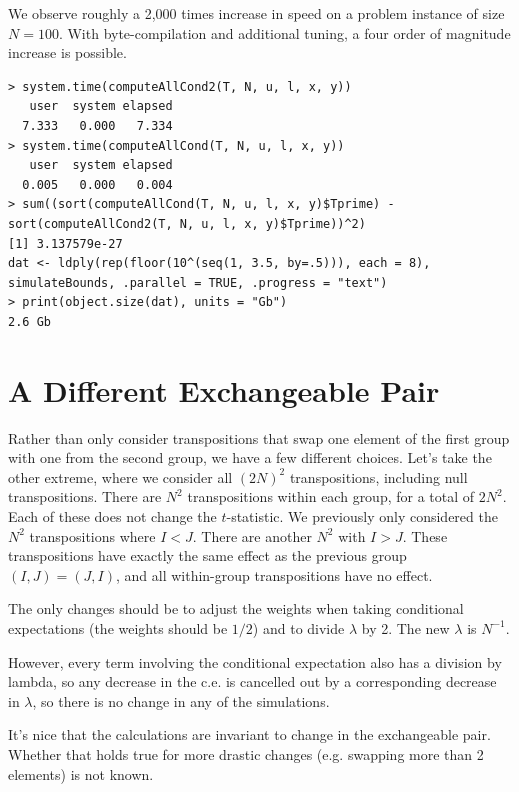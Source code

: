 We observe roughly a 2,000 times increase in speed on a problem instance of size $N=100$.  With
byte-compilation and additional tuning, a four order of magnitude increase is possible.  
\begin{verbatim}
> system.time(computeAllCond2(T, N, u, l, x, y))
   user  system elapsed 
  7.333   0.000   7.334 
> system.time(computeAllCond(T, N, u, l, x, y))
   user  system elapsed 
  0.005   0.000   0.004 
> sum((sort(computeAllCond(T, N, u, l, x, y)$Tprime) - sort(computeAllCond2(T, N, u, l, x, y)$Tprime))^2)
[1] 3.137579e-27
dat <- ldply(rep(floor(10^(seq(1, 3.5, by=.5))), each = 8),
simulateBounds, .parallel = TRUE, .progress = "text")
> print(object.size(dat), units = "Gb")
2.6 Gb
\end{verbatim}

\section{A Different Exchangeable Pair}
Rather than only consider transpositions that swap one element of the
first group with one from the second group, we have a few different
choices.  Let's take the other extreme, where we consider all $(2N)^2$
transpositions, including null transpositions.  There are $N^2$
transpositions within each group, for a total of $2N^2$.  Each of
these does not change the $t$-statistic.  We previously only
considered the $N^2$ transpositions where $I < J$.  There are another
$N^2$ with $I > J$.  These transpositions have exactly the same effect
as the previous group $(I, J) = (J, I)$, and all within-group
transpositions have no effect.  

The only changes should be to adjust the weights when taking
conditional expectations (the weights should be $1/2$) and to divide
$\lambda$ by 2.  The new $\lambda$ is $N^{-1}$.

However, every term involving the conditional expectation also has a
division by lambda, so any decrease in the c.e. is cancelled out by a
corresponding decrease in $\lambda$, so there is no change in any of
the simulations.

It's nice that the calculations are invariant to change in the
exchangeable pair.  Whether that holds true for more drastic changes
(e.g. swapping more than 2 elements) is not known.

